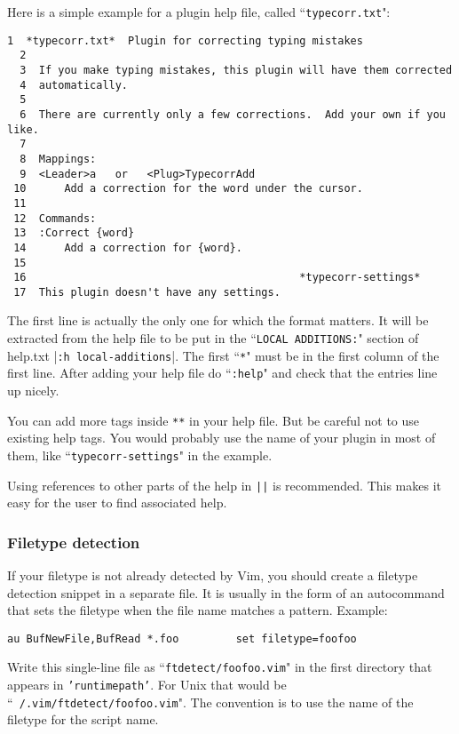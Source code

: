 Here is a simple example for a plugin help file, called ``\texttt{typecorr.txt}":

\begin{Verbatim}[samepage=true]
  1  *typecorr.txt*  Plugin for correcting typing mistakes
  2
  3  If you make typing mistakes, this plugin will have them corrected
  4  automatically.
  5
  6  There are currently only a few corrections.  Add your own if you like.
  7
  8  Mappings:
  9  <Leader>a   or   <Plug>TypecorrAdd
 10      Add a correction for the word under the cursor.
 11
 12  Commands:
 13  :Correct {word}
 14      Add a correction for {word}.
 15
 16                                           *typecorr-settings*
 17  This plugin doesn't have any settings.
\end{Verbatim}

The first line is actually the only one for which the format matters.
It will be extracted from the help file to be put in the ``\texttt{LOCAL ADDITIONS:}" section of help.txt |\texttt{:h local-additions}|.
The first ``\texttt{*}" must be in the first column of the first line.
After adding your help file do ``\texttt{:help}" and check that the entries line up nicely.

You can add more tags inside \texttt{**} in your help file.
But be careful not to use existing help tags.
You would probably use the name of your plugin in most of them, like ``\texttt{typecorr-settings}" in the example.

Using references to other parts of the help in \texttt{||} is recommended.
This makes it easy for the user to find associated help.
\subsubsection{Filetype detection}
\label{plugin-filetype}
If your filetype is not already detected by Vim, you should create a filetype detection snippet in a separate file.
It is usually in the form of an autocommand that sets the filetype when the file name matches a pattern.
Example:

\begin{Verbatim}[samepage=true]
 au BufNewFile,BufRead *.foo         set filetype=foofoo
\end{Verbatim}

Write this single-line file as ``\texttt{ftdetect/foofoo.vim}" in the first directory that appears in \texttt{'runtimepath'}.
For Unix that would be ``\texttt{~/.vim/ftdetect/foofoo.vim}".
The convention is to use the name of the filetype for the script name.

